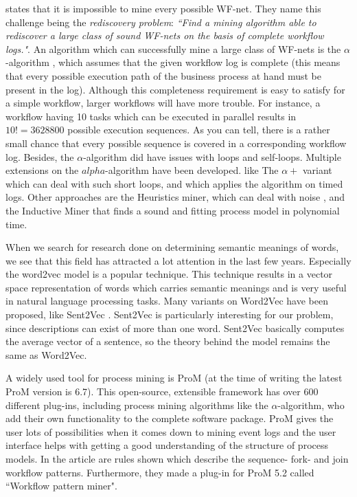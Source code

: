 \documentclass[a4paper,11pt]{article}
\begin{document}
\cite{VanDerAalst2002} states that it is impossible to mine every possible WF-net. They name this challenge being the \textit{rediscovery problem}: \textit{``Find a mining algorithm able to rediscover a large class of sound WF-nets on the basis of complete workflow logs."}\cite{VanDerAalst2002}. An algorithm which can successfully mine a large class of WF-nets is the $\alpha$-algorithm \cite{VanderAalst2003,VanDerAalst2002,VanderAalst2002TimedLogs}, which assumes that the given workflow log is complete (this means that every possible execution path of the business process at hand must be present in the log). Although this completeness requirement is easy to satisfy for a simple workflow, larger workflows will have more trouble. For instance, a workflow having 10 tasks which can be executed in parallel results in $10!=3628800$ possible execution sequences. As you can tell, there is a rather small chance that every possible sequence is covered in a corresponding workflow log. Besides, the $\alpha$-algorithm did have issues with loops and self-loops. Multiple extensions on the $alpha$-algorithm have been developed. like The $\alpha+$ variant \cite{A+-algorithm2004} which can deal with such short loops, and \cite{VanderAalst2002TimedLogs} which applies the algorithm on timed logs. Other approaches are the Heuristics miner, which can deal with noise \cite{HeuristicsMiner2006}, and the Inductive Miner \cite{InductiveMiner2013} that finds a sound and fitting process model in polynomial time.


When we search for research done on determining semantic meanings of words, we see that this field has attracted a lot attention in the last few years. Especially the word2vec model \cite{Mikolov2013a,Mikolov2013b} is a popular technique. This technique results in a vector space representation of words which carries semantic meanings and is very useful in natural language processing tasks. Many variants on Word2Vec have been proposed, like Sent2Vec \cite{Sent2Vec}. Sent2Vec is particularly interesting for our problem, since descriptions can exist of more than one word. Sent2Vec basically computes the average vector of a sentence, so the theory behind the model remains the same as Word2Vec.

A widely used tool for process mining is ProM \cite{ProM6} (at the time of writing the latest ProM version is 6.7). This open-source, extensible framework has over 600 different plug-ins, including process mining algorithms like the $\alpha$-algorithm, who add their own functionality to the complete software package. ProM gives the user lots of possibilities when it comes down to mining event logs and the user interface helps with getting a good understanding of the structure of process models. In the article \cite{WorkflowMiner2006} are rules shown which describe the sequence- fork- and join workflow patterns. Furthermore, they made a plug-in for ProM 5.2 called ``Workflow pattern miner". 
\end{document}
